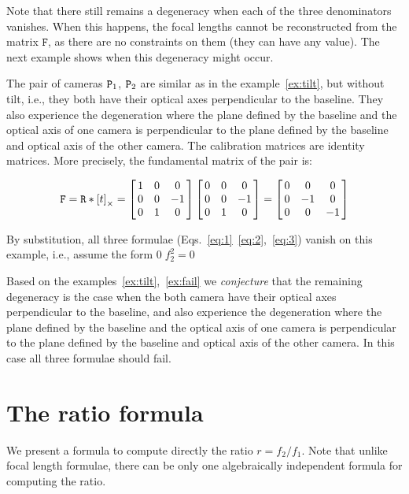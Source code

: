 Note that there still remains a degeneracy when each of the three denominators vanishes. When this happens, the focal lengths cannot be reconstructed from the matrix $\mathtt{F}$, as there are no constraints on them (they can have any value). The next example shows when this degeneracy might occur.

\begin{exmp}
\label{ex:fail}
The pair of cameras $\mathtt{P}_1$, $\mathtt{P}_2$ are similar as in the example~\ref{ex:tilt}, but without tilt, i.e., they both have their optical axes perpendicular to the baseline. They also experience the degeneration where the plane defined by the baseline and the optical axis of one camera is perpendicular to the plane defined by the baseline and optical axis of the other camera. The calibration matrices are identity matrices. More precisely, the fundamental matrix of the pair is:

\begin{equation*}
    \M{F}= \M{R} * \cross{t} = \mat{ccc}{1 & 0 & 0 \\ 0 & 0 & -1 \\ 0 & 1 & 0}  \mat{ccc}{0 & 0 & 0 \\ 0 & 0 & -1 \\ 0 & 1 & 0} = \mat{ccc}{0 & 0 & 0 \\ 0 & -1 & 0 \\ 0 & 0 & -1}
\end{equation*}

By substitution, all three formulae (Eqs.~\ref{eq:1}~\ref{eq:2},~\ref{eq:3}) vanish on this example, i.e., assume the form $  0 \; f_2^2 = 0 $

\end{exmp}


Based on the examples~\ref{ex:tilt},~\ref{ex:fail} we \textit{conjecture} that the remaining degeneracy is the case when the both camera have their optical axes perpendicular to the baseline, and also experience the degeneration where the plane defined by the baseline and the optical axis of one camera is perpendicular to the plane defined by the baseline and optical axis of the other camera. In this case all three formulae should fail.

\section{The ratio formula}
We present a formula to compute directly the ratio $r = f_2 \slash f_1$. Note that unlike focal length formulae, there can be only one algebraically independent formula for computing the ratio.

